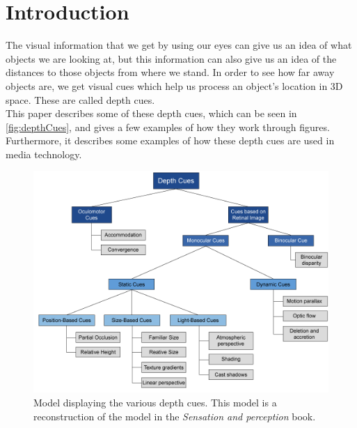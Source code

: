 \section{Introduction}

The visual information that we get by using our eyes can give us an idea of what objects we are looking at, but this information can also give us an idea of the distances to those objects from where we stand. In order to see how far away objects are, we get visual cues which help us process an object's location in 3D space. These are called depth cues\citep[p.~195]{sensationPerception}.\\
This paper describes some of these depth cues, which can be seen in \autoref{fig:depthCues}, and gives a few examples of how they work through figures. Furthermore, it describes some examples of how these depth cues are used in media technology.

\begin{figure}[H]
	\centering
	\includegraphics[width=1\linewidth]{figure/Analysis/depthCues.png}
	\caption{Model displaying the various depth cues. This model is a reconstruction of the model in the \textit{Sensation and perception} book\citep[p.~195]{sensationPerception}.}
	\label{fig:depthCues}
\end{figure}

\cite{missingDepthCure}
\cite{objectsInDepth}
\cite{parallaxStereoscopic}
\cite{perceptionCognitionVisualSpace}
\cite{useOfCues}
\cite{3dDisplays}